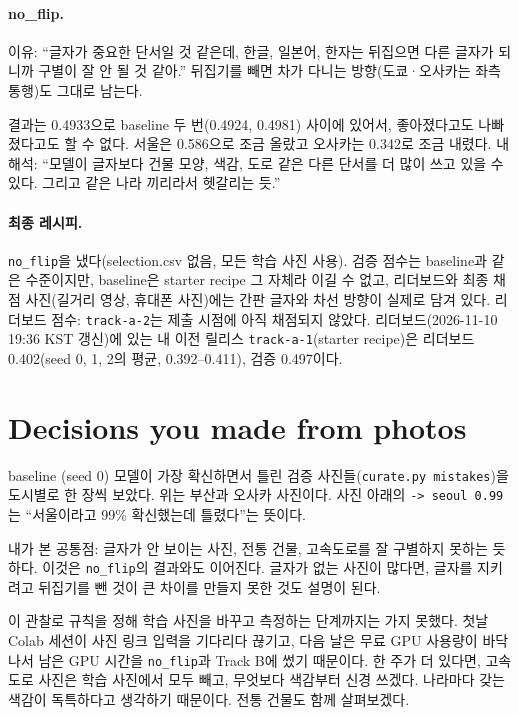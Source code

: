 \documentclass[11pt]{article}
\begin{document}
\paragraph{no\_flip.} 이유: ``글자가 중요한 단서일 것 같은데, 한글, 일본어, 한자는 뒤집으면 다른
글자가 되니까 구별이 잘 안 될 것 같아.'' 뒤집기를 빼면 차가 다니는 방향(도쿄·오사카는 좌측통행)도
그대로 남는다.

결과는 0.4933으로 baseline 두 번(0.4924, 0.4981) 사이에 있어서, 좋아졌다고도 나빠졌다고도
할 수 없다. 서울은 0.586으로 조금 올랐고 오사카는 0.342로 조금 내렸다.
내 해석: ``모델이 글자보다 건물 모양, 색감, 도로 같은 다른 단서를 더 많이 쓰고 있을 수 있다.
그리고 같은 나라 끼리라서 헷갈리는 듯.''

\paragraph{최종 레시피.} \texttt{no\_flip}을 냈다(selection.csv 없음, 모든 학습 사진 사용).
검증 점수는 baseline과 같은 수준이지만, baseline은 starter recipe 그 자체라 이길 수 없고,
리더보드와 최종 채점 사진(길거리 영상, 휴대폰 사진)에는 간판 글자와 차선 방향이 실제로 담겨 있다.
리더보드 점수: \texttt{track-a-2}는 제출 시점에 아직 채점되지 않았다. 리더보드(2026-11-10 19:36 KST 갱신)에 있는 내 이전 릴리스 \texttt{track-a-1}(starter recipe)은 리더보드 0.402(seed 0, 1, 2의 평균, 0.392--0.411), 검증 0.497이다.

\section*{Decisions you made from photos}


baseline (seed 0) 모델이 가장 확신하면서 틀린 검증 사진들(\texttt{curate.py mistakes})을
도시별로 한 장씩 보았다. 위는 부산과 오사카 사진이다. 사진 아래의 \texttt{-> seoul 0.99}는
``서울이라고 99\% 확신했는데 틀렸다''는 뜻이다.

내가 본 공통점: 글자가 안 보이는 사진, 전통 건물, 고속도로를 잘 구별하지 못하는 듯하다.
이것은 \texttt{no\_flip}의 결과와도 이어진다. 글자가 없는 사진이 많다면, 글자를 지키려고 뒤집기를
뺀 것이 큰 차이를 만들지 못한 것도 설명이 된다.

이 관찰로 규칙을 정해 학습 사진을 바꾸고 측정하는 단계까지는 가지 못했다.
첫날 Colab 세션이 사진 링크 입력을 기다리다 끊기고, 다음 날은 무료 GPU 사용량이 바닥나서
남은 GPU 시간을 \texttt{no\_flip}과 Track B에 썼기 때문이다. 한 주가 더 있다면, 고속도로 사진은 학습 사진에서 모두 빼고, 무엇보다 색감부터 신경 쓰겠다. 나라마다 갖는 색감이 독특하다고 생각하기 때문이다. 전통 건물도 함께 살펴보겠다.
\end{document}
